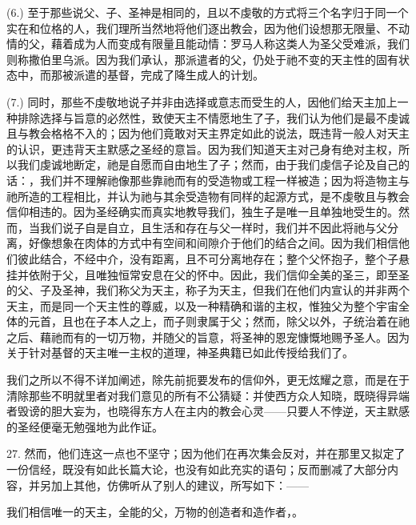(6.) 至于那些说父、子、圣神是相同的，且以不虔敬的方式将三个名字归于同一个实在和位格的人，我们理所当然地将他们逐出教会，因为他们设想那无限量、不动情的父，藉着成为人而变成有限量且能动情：罗马人称这类人为圣父受难派，我们则称撒伯里乌派。因为我们承认，那派遣者的父，仍处于祂不变的天主性的固有状态中，而那被派遣的基督，完成了降生成人的计划。\par

(7.) 同时，那些不虔敬地说子并非由选择或意志而受生的人，因他们给天主加上一种排除选择与旨意的必然性，致使天主不情愿地生了子，我们认为他们是最不虔诚且与教会格格不入的；因为他们竟敢对天主界定如此的说法，既违背一般人对天主的认识，更违背天主默感之圣经的意旨。因为我们知道天主对己身有绝对主权，所以我们虔诚地断定，祂是自愿而自由地生了子；然而，由于我们虔信子论及自己的话：，我们并不理解祂像那些靠祂而有的受造物或工程一样被造；因为将造物主与祂所造的工程相比，并认为祂与其余受造物有同样的起源方式，是不虔敬且与教会信仰相违的。因为圣经确实而真实地教导我们，独生子是唯一且单独地受生的。然而，当我们说子自是自立，且生活和存在与父一样时，我们并不因此将祂与父分离，好像想象在肉体的方式中有空间和间隙介于他们的结合之间。因为我们相信他们彼此结合，不经中介，没有距离，且不可分离地存在；整个父怀抱子，整个子悬挂并依附于父，且唯独恒常安息在父的怀中。因此，我们信仰全美的圣三，即至圣的父、子及圣神，我们称父为天主，称子为天主，但我们在他们内宣认的并非两个天主，而是同一个天主性的尊威，以及一种精确和谐的主权，惟独父为整个宇宙全体的元首，且也在子本人之上，而子则隶属于父；然而，除父以外，子统治着在祂之后、藉祂而有的一切万物，并随父的旨意，将圣神的恩宠慷慨地赐予圣人。因为关于针对基督的天主唯一主权的道理，神圣典籍已如此传授给我们了。\par

我们之所以不得不详加阐述，除先前扼要发布的信仰外，更无炫耀之意，而是在于清除那些不明就里者对我们意见的所有不公猜疑：并使西方众人知晓，既晓得异端者毁谤的胆大妄为，也晓得东方人在主内的教会心灵——只要人不悖逆，天主默感的圣经便毫无勉强地为此作证。\par

27. 然而，他们连这一点也不坚守；因为他们在再次集会反对，并在那里又拟定了一份信经，既没有如此长篇大论，也没有如此充实的语句；反而删减了大部分内容，并另加上其他，仿佛听从了别人的建议，所写如下：——\par

我们相信唯一的天主，全能的父，万物的创造者和造作者，。\par

